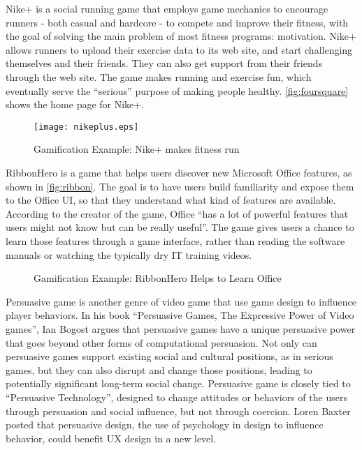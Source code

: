 Nike+ \cite{nikeplus} is a social running game that employs game mechanics to encourage runners - both casual and hardcore - to compete and improve their fitness, with the goal of solving the main problem of most fitness programs: motivation. Nike+ allows runners to upload their exercise data to its web site, and start challenging themselves and their friends. They can also get support from their friends through the web site. The game makes running and exercise fun, which eventually serve the ``serious'' purpose of making people healthy. \autoref{fig:foursquare} shows the home page for Nike+.

\begin{figure}[ht!]
	\centering
		\texttt{[image: nikeplus.eps]}
		\caption{Gamification Example: Nike+ makes fitness run\cite{nikeplus}}
		\label{fig:nikeplus}
\end{figure}

RibbonHero \cite{ribbonhero} is a game that helps users discover new Microsoft Office features, as shown in \autoref{fig:ribbon}. The goal is to have users build familiarity and expose them to the Office UI, so that they understand what kind of features are available. According to the creator of the game, Office ``has a lot of powerful features that users might not know but can be really useful''. The game gives users a chance to learn those features through a game interface, rather than reading the software manuals or watching the typically dry IT training videos.

\begin{figure}[ht!]
	\centering
		\caption{Gamification Example: RibbonHero Helps to Learn Office\cite{ribbonhero}}
		\label{fig:ribbon}
\end{figure}

Persuasive game is another genre of video game that use game design to influence player behaviors. In his book ``Persuasive Games, The Expressive Power of Video games'', Ian Bogost\cite{bogost2007persuasive} argues that persuasive games have a unique persuasive power that goes beyond other forms of computational persuasion. Not only can
persuasive games support existing social and cultural positions, as in serious games, but they can also
disrupt and change those positions, leading to potentially significant long-term social change. Persuasive game is closely tied to ``Persuasive Technology''\cite{fogg_2003}, designed to change attitudes or behaviors of the users through persuasion and social influence, but not through coercion. Loren Baxter\cite{baxter_2011} posted that persuasive design, the use of psychology in design to influence behavior, could benefit UX design in a new level.

